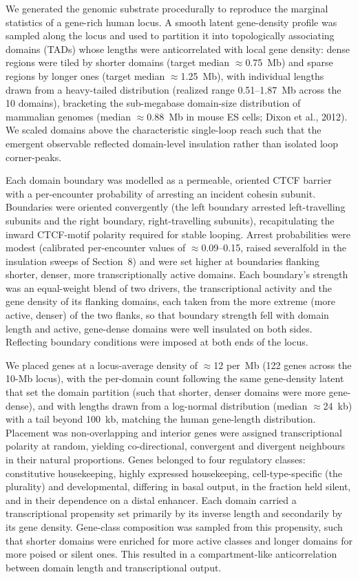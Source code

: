 \documentclass[11pt]{article}
\begin{document}
We generated the genomic substrate procedurally to reproduce the marginal
statistics of a gene-rich human locus. A smooth latent gene-density profile was
sampled along the locus and used to partition it into topologically associating
domains (TADs) whose lengths were anticorrelated with local gene density: dense
regions were tiled by shorter domains (target median $\approx$0.75~Mb) and sparse
regions by longer ones (target median $\approx$1.25~Mb), with individual lengths
drawn from a heavy-tailed distribution (realized range 0.51--1.87~Mb across the 10 domains),
bracketing the sub-megabase domain-size distribution of mammalian genomes (median
$\approx$0.88~Mb in mouse ES cells; Dixon et al., 2012). We scaled domains above the characteristic single-loop reach such that the
emergent observable reflected domain-level insulation rather than isolated loop
corner-peaks.

Each domain boundary was modelled as a permeable, oriented CTCF barrier with a per-encounter
probability of arresting an incident cohesin subunit.
Boundaries were oriented convergently (the left boundary arrested left-travelling
subunits and the right boundary, right-travelling subunits), recapitulating the
inward CTCF-motif polarity required for stable looping. Arrest probabilities were
modest (calibrated per-encounter values of $\approx$0.09--0.15, raised severalfold in
the insulation sweeps of Section~8) and were set higher at boundaries flanking shorter, denser,
more transcriptionally active domains. Each boundary's strength was an equal-weight
blend of two drivers, the transcriptional activity and the gene density of its
flanking domains, each taken from the more extreme (more active, denser) of the two
flanks, so that boundary strength fell with domain length and active, gene-dense
domains were well insulated on both sides. Reflecting boundary conditions were imposed at both ends of the locus.

We placed genes at a locus-average density of $\approx$12 per~Mb (122 genes across
the 10-Mb locus), with the
per-domain count following the same gene-density latent that set the domain
partition (such that shorter, denser domains were more gene-dense), and with lengths
drawn from a log-normal distribution (median $\approx$24~kb) with a tail beyond
100~kb, matching the human gene-length distribution. Placement was non-overlapping
and interior genes were assigned transcriptional polarity at random, yielding
co-directional, convergent and divergent neighbours in their natural proportions.
Genes belonged to four regulatory classes: constitutive housekeeping, highly
expressed housekeeping, cell-type-specific (the plurality) and developmental,
differing in basal output, in the fraction held silent, and in their dependence on
a distal enhancer. Each domain carried a transcriptional propensity set primarily by its inverse length and secondarily by its gene density. Gene-class composition was sampled from this propensity, such that shorter domains were enriched for more active classes and longer domains for more poised or silent ones. This resulted in a compartment-like anticorrelation between domain length and transcriptional output.
\end{document}
